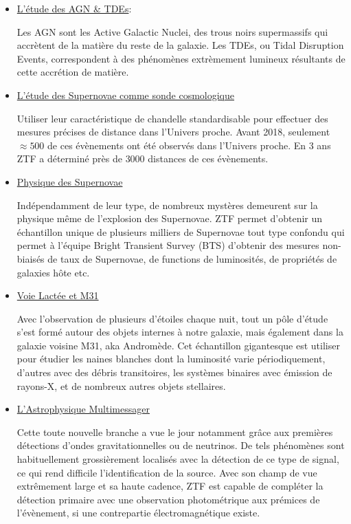\documentclass[../main/main.tex]{subfiles}
\begin{document}
\begin{itemize}[label=$\bullet$]
\setlength\itemsep{1em}
    \item \underline{L'étude des AGN \& TDEs}:
  
      Les AGN sont les Active Galactic Nuclei, des trous noirs
      supermassifs qui accrètent de la matière du reste de la
      galaxie. Les TDEs, ou Tidal Disruption Events, correspondent à des
      phénomènes extrèmement lumineux résultants de cette accrétion de
      matière.

    \item \underline{L'étude des Supernovae comme sonde cosmologique}
      
      Utiliser leur caractéristique de chandelle standardisable pour
      effectuer des mesures précises de distance dans l'Univers
      proche. Avant 2018, seulement $\approx500$ de ces évènements ont
      été observés dans l'Univers proche. En 3 ans ZTF a déterminé près
      de $3000$ distances de ces évènements.

    \item \underline{Physique des Supernovae}

      Indépendamment de leur type, de nombreux mystères demeurent sur la
      physique même de l'explosion des Supernovae. ZTF permet d'obtenir
      un échantillon unique de plusieurs milliers de Supernovae tout
      type confondu qui permet à l'équipe Bright Transient Survey
      (BTS) d'obtenir des mesures non-biaisés de taux de Supernovae, de functions de
      luminosités, de propriétés de galaxies hôte etc.

    \item \underline{Voie Lactée et M31}

      Avec l'observation de plusieurs d'étoiles chaque nuit, tout un
      pôle d'étude s'est formé autour des objets internes à notre
      galaxie, mais également dans la galaxie voisine M31, aka
      Andromède. Cet échantillon gigantesque est utiliser pour étudier
      les naines blanches dont la luminosité varie périodiquement,
      d'autres avec des débris transitoires, les systèmes binaires avec
      émission de rayons-X, et de nombreux autres objets stellaires.


    \item \underline{L'Astrophysique Multimessager}

      Cette toute nouvelle branche a vue le jour notamment grâce aux
      premières détections d'ondes gravitationnelles ou de neutrinos. De
      tels phénomènes sont habituellement grossièrement localisés avec
      la détection de ce type de signal, ce qui rend difficile
      l'identification de la source. Avec son champ de vue extrêmement
      large et sa haute cadence, ZTF est capable de compléter la
      détection primaire avec une observation photométrique aux prémices de
      l'évènement, si une contrepartie électromagnétique existe.


\end{itemize}
\end{document}
